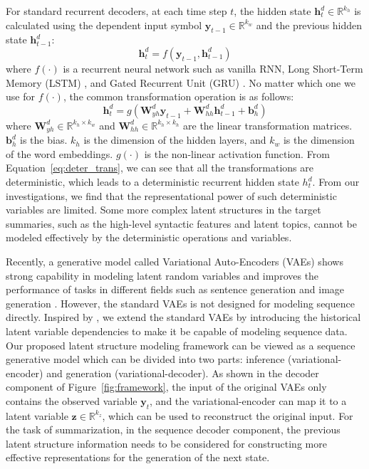 \documentclass[11pt,letterpaper]{article}
\begin{document}
For standard recurrent decoders, at each time step $t$, the hidden state $\mathbf{h}^d_t \in \mathbb{R}^{k_h}$ is calculated using the dependent input symbol $\mathbf{y}_{t-1} \in \mathbb{R}^{k_w}$ and the previous hidden state $\mathbf{h}^d_{t-1}$:
\begin{equation}
\mathbf{h}_t^d = f(\mathbf{y}_{t-1}, \mathbf{h}_{t-1}^d)
\end{equation}
where $f(\cdot)$ is a recurrent neural network such as vanilla RNN, Long Short-Term Memory (LSTM) \cite{hochreiter1997long}, and Gated Recurrent Unit (GRU) \cite{cho2014learning}. 
No matter which one we use for $f(\cdot)$, the common transformation operation is as follows:
\begin{equation}
\mathbf{h}_t^d = g(\mathbf{W}_{yh}^d\mathbf{y}_{t-1} + \mathbf{W}_{hh}^d\mathbf{h}_{t - 1}^d + \mathbf{b}_h^d)
\label{eq:deter_trans}
\end{equation}
where $\mathbf{W}_{yh}^d \in \mathbb{R} ^ {k_h \times k_w}$ and $\mathbf{W}_{hh}^d \in \mathbb{R} ^ {k_h \times k_h}$ are the linear transformation matrices. $\mathbf{b}_h^d$ is the bias. $k_h$ is the dimension of the hidden layers, and $k_w$ is the dimension of the word embeddings.
$g(\cdot)$ is the non-linear activation function.
From Equation~\ref{eq:deter_trans}, we can see that all the transformations are deterministic, which leads to a deterministic recurrent hidden state $h_t^d$.
From our investigations, we find that the representational power of such deterministic variables are limited.
Some more complex latent structures in the target summaries, such as the high-level syntactic features and latent topics, cannot be modeled effectively by the deterministic operations and variables.

Recently, a generative model called Variational Auto-Encoders (VAEs) \cite{kingma2013auto,rezende2014stochastic} shows strong capability in modeling latent random variables and improves the performance of tasks in different fields such as sentence generation \cite{bowman2016generating} and image generation \cite{gregor2015draw}.
However, the standard VAEs is not designed for modeling sequence directly.
Inspired by \cite{chung2015recurrent}, we extend the standard VAEs by introducing the historical latent variable dependencies to make it be capable of modeling sequence data.  
Our proposed latent structure modeling framework can be viewed as a sequence generative model which can be divided into two parts: inference (variational-encoder) and generation (variational-decoder). 
As shown in the decoder component of Figure~\ref{fig:framework}, the input of the original VAEs only contains the observed variable $\mathbf{y}_t$, and the variational-encoder can map it to a latent variable  $\mathbf{z} \in {\mathbb{R}^{k_z}}$, which can be used to reconstruct the original input.
For the task of summarization, in the sequence decoder component, the previous latent structure information needs to be considered for constructing more effective representations for the generation of the next state.
\end{document}
